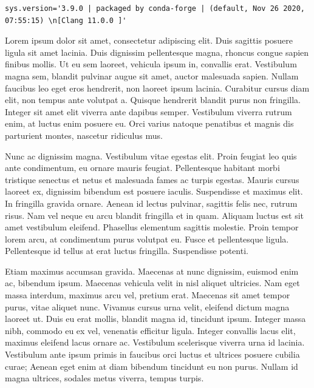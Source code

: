 \documentclass[
  letterpaper,
  DIV=11,
  numbers=noendperiod]{scrreprt}
\begin{document}
\begin{verbatim}
sys.version='3.9.0 | packaged by conda-forge | (default, Nov 26 2020, 07:55:15) \n[Clang 11.0.0 ]'
\end{verbatim}

Lorem ipsum dolor sit amet, consectetur adipiscing elit. Duis sagittis
posuere ligula sit amet lacinia. Duis dignissim pellentesque magna,
rhoncus congue sapien finibus mollis. Ut eu sem laoreet, vehicula ipsum
in, convallis erat. Vestibulum magna sem, blandit pulvinar augue sit
amet, auctor malesuada sapien. Nullam faucibus leo eget eros hendrerit,
non laoreet ipsum lacinia. Curabitur cursus diam elit, non tempus ante
volutpat a. Quisque hendrerit blandit purus non fringilla. Integer sit
amet elit viverra ante dapibus semper. Vestibulum viverra rutrum enim,
at luctus enim posuere eu. Orci varius natoque penatibus et magnis dis
parturient montes, nascetur ridiculus mus.

Nunc ac dignissim magna. Vestibulum vitae egestas elit. Proin feugiat
leo quis ante condimentum, eu ornare mauris feugiat. Pellentesque
habitant morbi tristique senectus et netus et malesuada fames ac turpis
egestas. Mauris cursus laoreet ex, dignissim bibendum est posuere
iaculis. Suspendisse et maximus elit. In fringilla gravida ornare.
Aenean id lectus pulvinar, sagittis felis nec, rutrum risus. Nam vel
neque eu arcu blandit fringilla et in quam. Aliquam luctus est sit amet
vestibulum eleifend. Phasellus elementum sagittis molestie. Proin tempor
lorem arcu, at condimentum purus volutpat eu. Fusce et pellentesque
ligula. Pellentesque id tellus at erat luctus fringilla. Suspendisse
potenti.

Etiam maximus accumsan gravida. Maecenas at nunc dignissim, euismod enim
ac, bibendum ipsum. Maecenas vehicula velit in nisl aliquet ultricies.
Nam eget massa interdum, maximus arcu vel, pretium erat. Maecenas sit
amet tempor purus, vitae aliquet nunc. Vivamus cursus urna velit,
eleifend dictum magna laoreet ut. Duis eu erat mollis, blandit magna id,
tincidunt ipsum. Integer massa nibh, commodo eu ex vel, venenatis
efficitur ligula. Integer convallis lacus elit, maximus eleifend lacus
ornare ac. Vestibulum scelerisque viverra urna id lacinia. Vestibulum
ante ipsum primis in faucibus orci luctus et ultrices posuere cubilia
curae; Aenean eget enim at diam bibendum tincidunt eu non purus. Nullam
id magna ultrices, sodales metus viverra, tempus turpis.
\end{document}
